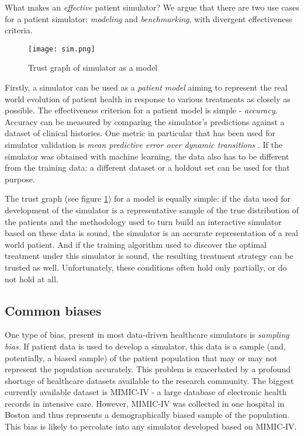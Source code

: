 What makes an \emph{effective} patient simulator? 
We argue that there are two use cases for a patient simulator: {\sl modeling} and {\sl benchmarking}, with divergent effectiveness criteria.

\begin{figure}
    \centering
    \texttt{[image: sim.png]}
    \caption{Trust graph of simulator as a model}
    \label{fig:model}
\end{figure}

Firstly, a simulator can be used as a \emph{patient model} aiming to represent the real world evolution of patient health in response to various treatments as closely as possible.
The effectiveness criterion for a patient model is simple - \emph{accuracy}.
Accuracy can be measured by comparing the simulator's predictions against a dataset of clinical histories.
One metric in particular that has been used for simulator validation is \emph{mean predictive error over dynamic transitions} \cite{mdpe}.
If the simulator was obtained with machine learning, the data also has to be different from the training data: a different dataset or a holdout set can be used for that purpose.

The trust graph (see figure \ref{fig:model}) for a model is equally simple: if the data used for development of the simulator is a representative sample of the true distribution of the patients and the methodology used to turn build an interactive simulator based on these data is sound, the simulator is an accurate representation of a real world patient.
And if the training algorithm used to discover the optimal treatment under this simulator is sound, the resulting treatment strategy can be trusted as well.
Unfortunately, these conditions often hold only partially, or do not hold at all.

\subsection{Common biases}
\label{sec:bias}

One type of bias, present in most data-driven healthcare simulators is \emph{sampling bias}.
If patient data is used to develop a simulator, this data is a sample (and, potentially, a biased sample) of the patient population that may or may not represent the population accurately.
This problem is exacerbated by a profound shortage of healthcare datasets available to the research community.
The biggest currently available dataset is MIMIC-IV \cite{johnsonMIMICIVFreelyAccessible2023} - a large database of electronic health records in intensive care.
However, MIMIC-IV was collected in one hospital in Boston and thus represents a demographically biased sample of the population.
This bias is likely to percolate into any simulator developed based on MIMIC-IV.

